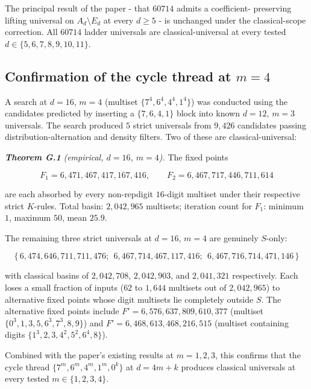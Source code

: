 \documentclass[11pt,letterpaper]{article}
\theoremstyle{paperstyle}
\theoremstyle{paperstyledef}
\theoremstyle{paperstylerem}
\begin{document}
The principal result of the paper - that \(60714\) admits a
coefficient- preserving lifting universal on \(A_d \setminus E_d\) at
every \(d \geq 5\) - is unchanged under the classical-scope
correction. All \(60714\) ladder universals are classical-universal at
every tested \(d \in \{5, 6, 7, 8, 9, 10, 11\}\).

\hypertarget{g.4-confirmation-of-the-cycle-thread-at-m-4}{%
\subsection{\texorpdfstring{Confirmation of the cycle thread at \(m = 4\)}{Confirmation of the cycle thread at m = 4}}\label{g.4-confirmation-of-the-cycle-thread-at-m-4}}

A search at \(d = 16\), \(m = 4\) (multiset \(\{7^4, 6^4, 4^4, 1^4\}\))
was conducted using the candidates predicted by inserting a
\(\{7, 6, 4, 1\}\) block into known \(d = 12\), \(m = 3\) universals.
The search produced \(5\) strict universals from \(9{,}426\) candidates
passing distribution-alternation and density filters. Two of these are
classical-universal:

\textbf{\emph{Theorem G.1}} \emph{(empirical, \(d = 16\), \(m = 4\)).}
The fixed points

\[F_1 = 6{,}471{,}467{,}417{,}167{,}416, \qquad F_2 = 6{,}467{,}717{,}446{,}711{,}614\]

are each absorbed by every non-repdigit \(16\)-digit multiset under
their respective strict \(K\)-rules. Total basin: \(2{,}042{,}965\)
multisets; iteration count for \(F_1\): minimum \(1\), maximum \(50\),
mean \(25.9\).

The remaining three strict universals at \(d = 16\), \(m = 4\) are
genuinely \(S\)-only:

\[\{\,6{,}474{,}646{,}711{,}711{,}476;\ \ 6{,}467{,}714{,}467{,}117{,}416;\ \ 6{,}467{,}716{,}714{,}471{,}146\,\}\]

with classical basins of \(2{,}042{,}708\), \(2{,}042{,}903\), and
\(2{,}041{,}321\) respectively. Each loses a small fraction of inputs
(\(62\) to \(1{,}644\) multisets out of \(2{,}042{,}965\)) to
alternative fixed points whose digit multisets lie completely outside
\(S\). The alternative fixed points include
\(F' = 6{,}576{,}637{,}809{,}610{,}377\) (multiset
\(\{0^3, 1, 3, 5, 6^3, 7^3, 8, 9\}\)) and
\(F' = 6{,}468{,}613{,}468{,}216{,}515\) (multiset containing digits
\(\{1^3, 2, 3, 4^2, 5^2, 6^4, 8\}\)).

Combined with the paper's existing results at \(m = 1, 2, 3\), this
confirms that the cycle thread \(\{7^m, 6^m, 4^m, 1^m, 0^k\}\) at
\(d = 4m + k\) produces classical universals at every tested
\(m \in \{1, 2, 3, 4\}\).
\end{document}
